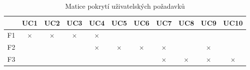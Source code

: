 \begin{table}[ht!]
    \centering
    \caption{Matice pokrytí uživatelských požadavků}\label{tab:maticePokryti}

    \begin{tabular}{r|c c c c c c c c c c}
           & UC1      & UC2      & UC3      & UC4      & UC5      & UC6      & UC7      & UC8      & UC9      & UC10     \\ \hline
        F1 & $\times$ & $\times$ & $\times$ & $\times$ &          &          &          &          &          &          \\
        F2 &          &          &          & $\times$ & $\times$ & $\times$ & $\times$ &          & $\times$ &          \\
        F3 &          &          &          &          &          &          & $\times$ & $\times$ & $\times$ & $\times$ \\
    \end{tabular}
\end{table}
